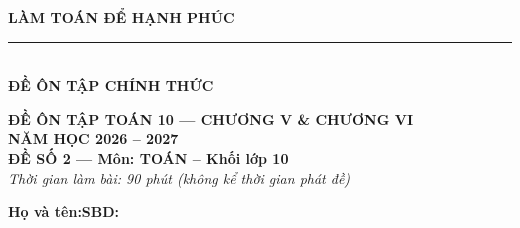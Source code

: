 \documentclass[10pt,a4paper]{article}
\begin{document}
\noindent
\begin{minipage}[c]{0.38\textwidth}
    \centering
    \textbf{LÀM TOÁN ĐỂ HẠNH PHÚC}\\[-2pt]
    \rule{3.2cm}{0.6pt}\\[2pt]
    \textbf{ĐỀ ÔN TẬP CHÍNH THỨC}
\end{minipage}\hfill
\begin{minipage}[c]{0.52\textwidth}
    \centering
    \textbf{ĐỀ ÔN TẬP TOÁN 10 — CHƯƠNG V \& CHƯƠNG VI}\\[1pt]
    \textbf{NĂM HỌC 2026 -- 2027}\\[1pt]
    \textbf{ĐỀ SỐ 2 — Môn: TOÁN -- Khối lớp 10}\\
    \textit{\small Thời gian làm bài: 90 phút (không kể thời gian phát đề)}
\end{minipage}

\vspace{0.05cm}
\noindent
\begin{minipage}[b]{0.78\textwidth}
    \textbf{Họ và tên:}\dotfill\textbf{SBD:}\makebox[3.5cm]{\dotfill}
\end{minipage}\hfill
\begin{minipage}[b]{0.20\textwidth}
    \hfill
    \setlength{\fboxrule}{0.8pt}%
\end{minipage}
\vspace{0.05cm}
\end{document}
